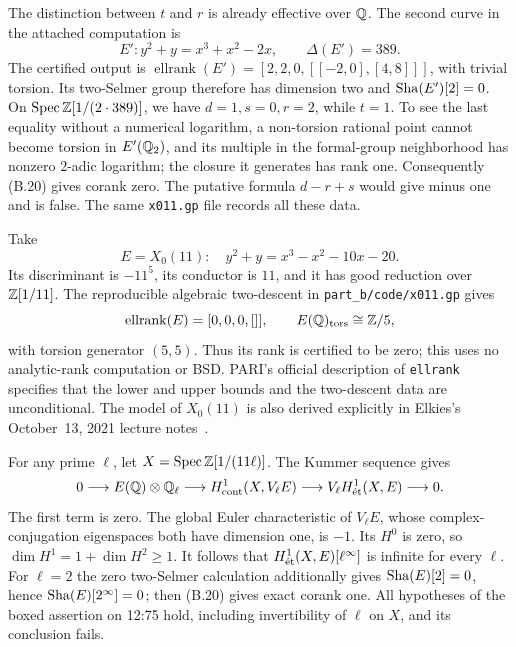 The distinction between \(t\) and \(r\) is already effective over \(\mathbb Q\).
The second curve in the attached computation is
\[
 E':y^2+y=x^3+x^2-2x,
 \qquad \Delta(E')=389.
\]
The certified output is \(\operatorname{ellrank}(E')=[2,2,0,
[[-2,0],[4,8]]]\), with trivial torsion.  Its two-Selmer group
therefore has dimension two and \(\mathop{\mathrm{Sha}}(E')[2]=0\).  On
\(\operatorname{Spec}\mathbb Z[1/(2\cdot389)]\), we have \(d=1,s=0,r=2\), while
\(t=1\).  To see the last equality without a numerical logarithm,
a non-torsion rational point cannot become torsion in \(E'(\mathbb Q_2)\),
and its multiple in the formal-group neighborhood has nonzero
\(2\)-adic logarithm; the closure it generates has rank one.
Consequently (B.20) gives corank zero.  The putative formula
\(d-r+s\) would give minus one and is false.  The same
\texttt{x011.gp} file records all these data.

\begin{example}\label{ex:B-X011}
Take
\[
 E=X_0(11):\quad y^2+y=x^3-x^2-10x-20.
\]
Its discriminant is \(-11^5\), its conductor is \(11\), and it has
good reduction over \(\mathbb Z[1/11]\).  The reproducible algebraic
two-descent in \texttt{part\_b/code/x011.gp} gives
\[
 \operatorname{ellrank}(E)=[0,0,0,[]],\qquad
 E(\mathbb Q)_{\rm tors}\cong\mathbb Z/5,
\]
with torsion generator \((5,5)\).  Thus its rank is certified to be
zero; this uses no analytic-rank computation or BSD.  PARI's official
description of \texttt{ellrank} specifies that the lower and upper
bounds and the two-descent data are unconditional.  The model of
\(X_0(11)\) is also derived explicitly in Elkies's October~13, 2021
lecture notes~\cite{BElkies2021,BPari2026}.

For any prime \(\ell\), let \(X=\operatorname{Spec}\mathbb Z[1/(11\ell)]\).
The Kummer sequence gives
\[
0\longrightarrow E(\mathbb Q)\otimes\mathbb Q_\ell
\longrightarrow H^1_{\mathrm{cont}}(X,V_\ell E)
\longrightarrow V_\ell H^1_{\mathrm{\acute et}}(X,E)\longrightarrow0.
\]
The first term is zero.  The global Euler characteristic of
\(V_\ell E\), whose complex-conjugation eigenspaces both have
dimension one, is \(-1\).  Its \(H^0\) is zero, so
\(\dim H^1=1+\dim H^2\ge1\).  It follows that
\(H^1_{\mathrm{\acute et}}(X,E)[\ell^\infty]\) is infinite for every \(\ell\).
For \(\ell=2\) the zero two-Selmer calculation additionally gives
\(\mathop{\mathrm{Sha}}(E)[2]=0\), hence \(\mathop{\mathrm{Sha}}(E)[2^\infty]=0\); then (B.20)
gives exact corank one.  All hypotheses of the boxed assertion on
12:75 hold, including invertibility of \(\ell\) on \(X\), and its
conclusion fails.
\end{example}


